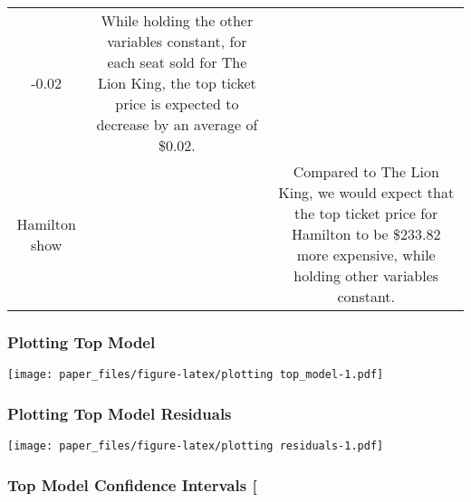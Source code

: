 \documentclass[
]{article}
\begin{document}
\begin{longtable}[]{@{}ccc@{}}
\begin{minipage}[t]{0.30\columnwidth}
-0.02\strut
\end{minipage} & \begin{minipage}[t]{0.30\columnwidth}\centering
While holding the other variables constant, for each seat sold for The Lion King, the top ticket price is expected to decrease by an average of \$0.02.\strut
\end{minipage}\tabularnewline
\begin{minipage}[t]{0.30\columnwidth}\centering
Hamilton show\strut
\end{minipage} & \begin{minipage}[t]{0.30\columnwidth}\centering
223.82\strut
\end{minipage} & \begin{minipage}[t]{0.30\columnwidth}\centering
Compared to The Lion King, we would expect that the top ticket price for Hamilton to be \$233.82 more expensive, while holding other variables constant.\strut
\end{minipage}\tabularnewline
\bottomrule
\end{longtable}

\hypertarget{plotting-top-model}{%
\subsubsection{Plotting Top Model}\label{plotting-top-model}}

\texttt{[image: paper\_files/figure-latex/plotting top\_model-1.pdf]}

\hypertarget{plotting-top-model-residuals}{%
\subsubsection{Plotting Top Model Residuals}\label{plotting-top-model-residuals}}

\texttt{[image: paper\_files/figure-latex/plotting residuals-1.pdf]}

\hypertarget{top-model-confidence-intervals}{%
\subsubsection{Top Model Confidence Intervals {[}}\label{top-model-confidence-intervals}}

 
  \providecommand{\huxb}[2]{\arrayrulecolor[RGB]{#1}\global\arrayrulewidth=#2pt}
  \providecommand{\huxvb}[2]{\color[RGB]{#1}\vrule width #2pt}
  \providecommand{\huxtpad}[1]{\rule{0pt}{#1}}
  \providecommand{\huxbpad}[1]{\rule[-#1]{0pt}{#1}}
\end{document}
